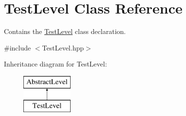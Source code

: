 \hypertarget{class_test_level}{}\section{Test\+Level Class Reference}
\label{class_test_level}


Contains the \hyperlink{class_test_level}{Test\+Level} class declaration.  




{\ttfamily \#include $<$Test\+Level.\+hpp$>$}

Inheritance diagram for Test\+Level\+:\begin{figure}[H]
\begin{center}
\leavevmode
\includegraphics[height=2.000000cm]{class_test_level}
\end{center}
\end{figure}
